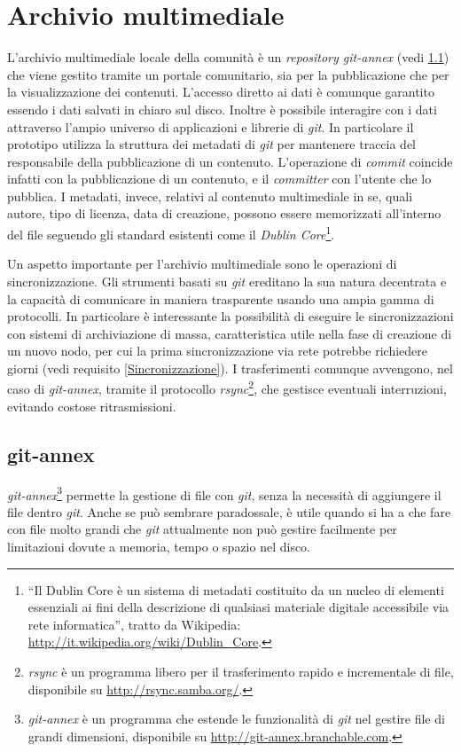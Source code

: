 \section{Archivio multimediale}
L'archivio multimediale locale della comunità è un \emph{repository
  git-annex} (vedi \ref{git-annex}) che viene gestito tramite un
portale comunitario, sia per la pubblicazione che per la
visualizzazione dei contenuti. L'accesso diretto ai dati è comunque
garantito essendo i dati salvati in chiaro sul disco. Inoltre è
possibile interagire con i dati attraverso l'ampio universo di
applicazioni e librerie di \emph{git}. In particolare il prototipo
utilizza la struttura dei metadati di \emph{git} per mantenere traccia
del responsabile della pubblicazione di un contenuto. L'operazione di
\emph{commit} coincide infatti con la pubblicazione di un contenuto, e
il \emph{committer} con l'utente che lo pubblica. I metadati, invece,
relativi al contenuto multimediale in se, quali autore, tipo di
licenza, data di creazione, possono essere memorizzati all'interno del
file seguendo gli standard esistenti come il \emph{Dublin
  Core}\footnote{``Il Dublin Core è un sistema di metadati costituito
  da un nucleo di elementi essenziali ai fini della descrizione di
  qualsiasi materiale digitale accessibile via rete informatica'',
  tratto da Wikipedia:
  \url{http://it.wikipedia.org/wiki/Dublin_Core}.}.

Un aspetto importante per l'archivio multimediale sono le operazioni
di sincronizzazione. Gli strumenti basati su \emph{git} ereditano la
sua natura decentrata e la capacità di comunicare in maniera
trasparente usando una ampia gamma di protocolli. In particolare è
interessante la possibilità di eseguire le sincronizzazioni con
sistemi di archiviazione di massa, caratteristica utile nella fase di
creazione di un nuovo nodo, per cui la prima sincronizzazione via rete
potrebbe richiedere giorni (vedi requisito \ref{Sincronizzazione}). I
trasferimenti comunque avvengono, nel caso di \emph{git-annex},
tramite il protocollo \emph{rsync}\footnote{\emph{rsync} è un
  programma libero per il trasferimento rapido e incrementale di file,
  disponibile su \url{http://rsync.samba.org/}.}, che gestisce
eventuali interruzioni, evitando costose ritrasmissioni.

\subsection{git-annex}\label{git-annex}
\emph{git-annex}\footnote{\emph{git-annex} è un programma che estende
  le funzionalità di \emph{git} nel gestire file di grandi dimensioni,
  disponibile su \url{http://git-annex.branchable.com}.} permette la
gestione di file con \emph{git}, senza la necessità di aggiungere il
file dentro \emph{git}. Anche se può sembrare paradossale, è utile
quando si ha a che fare con file molto grandi che \emph{git}
attualmente non può gestire facilmente per limitazioni dovute a
memoria, tempo o spazio nel disco.

